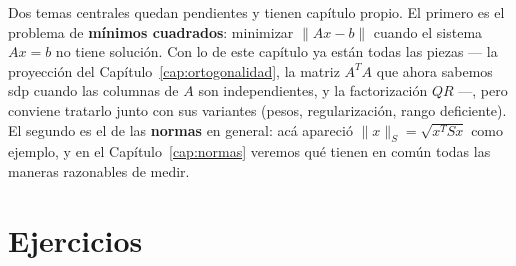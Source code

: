 \begin{remark}
Dos temas centrales quedan pendientes y tienen capítulo propio. El primero es
el problema de \textbf{mínimos cuadrados}: minimizar $\|Ax-b\|$ cuando el
sistema $Ax=b$ no tiene solución. Con lo de este capítulo ya están todas las
piezas --- la proyección del Capítulo~\ref{cap:ortogonalidad}, la matriz
$A^TA$ que ahora sabemos sdp cuando las columnas de $A$ son independientes, y
la factorización $QR$ ---, pero conviene tratarlo junto con sus variantes
(pesos, regularización, rango deficiente). El segundo es el de las
\textbf{normas} en general: acá apareció $\|x\|_S=\sqrt{x^TSx}$ como ejemplo,
y en el Capítulo~\ref{cap:normas} veremos qué tienen en común todas las
maneras razonables de medir.
\end{remark}

\section*{Ejercicios}

